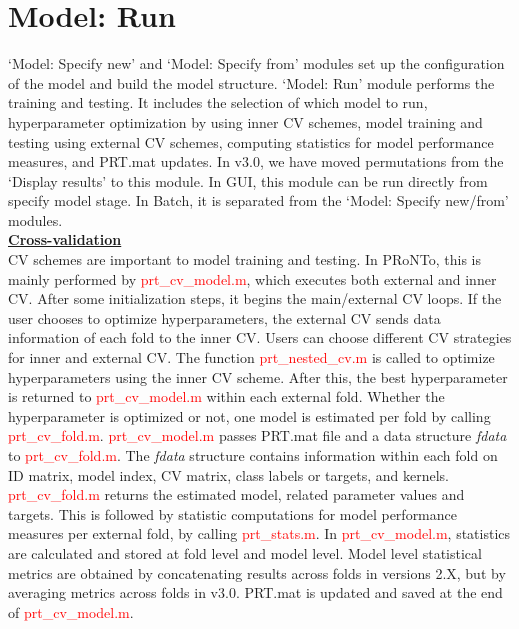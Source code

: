 



\section{Model: Run}

`Model: Specify new' and `Model: Specify from' modules set up the configuration of the model and build the model structure. `Model: Run' module performs the training and testing. It includes the selection of which model to run, hyperparameter optimization by using inner CV schemes, model training and testing using external CV schemes, computing statistics for model performance measures, and PRT.mat updates. In v3.0, we have moved permutations from the `Display results' to this module. In GUI, this module can be run directly from specify model stage. In Batch, it is separated from the `Model: Specify new/from' modules. 
\\ %

\noindent \textbf{\underline{Cross-validation}}
\\ %

CV schemes are important to model training and testing. In PRoNTo, this is mainly performed by \textcolor{red}{prt\_cv\_model.m}, which executes both external and inner CV. After some initialization steps, it begins the main/external CV loops. If the user chooses to optimize hyperparameters, the external CV sends data information of each fold to the inner CV. Users can choose different CV strategies for inner and external CV. The function \textcolor{red}{prt\_nested\_cv.m} is called to optimize hyperparameters using the inner CV scheme. After this, the best hyperparameter is returned to \textcolor{red}{prt\_cv\_model.m} within each external fold. Whether the hyperparameter is optimized or not, one model is estimated per fold by calling \textcolor{red}{prt\_cv\_fold.m}. \textcolor{red}{prt\_cv\_model.m} passes PRT.mat file and a data structure \textit{fdata} to \textcolor{red}{prt\_cv\_fold.m}. The \textit{fdata} structure contains information within each fold on ID matrix, model index, CV matrix, class labels or targets, and kernels. \textcolor{red}{prt\_cv\_fold.m} returns the estimated model, related parameter values and targets. This is followed by statistic computations for model performance measures per external fold, by calling \textcolor{red}{prt\_stats.m}. In \textcolor{red}{prt\_cv\_model.m}, statistics are calculated and stored at fold level and model level. Model level statistical metrics are obtained by concatenating results across folds in versions 2.X, but by averaging metrics across folds in v3.0. PRT.mat is updated and saved at the end of \textcolor{red}{prt\_cv\_model.m}.
\\

